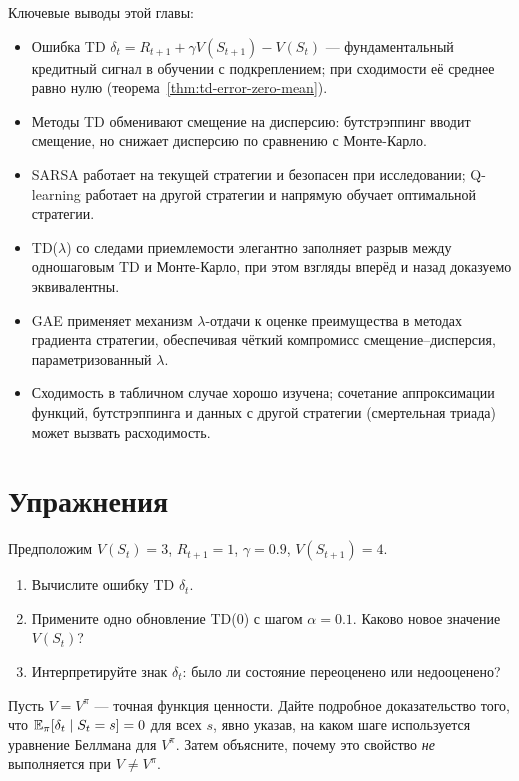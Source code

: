 Ключевые выводы этой главы:
\begin{itemize}[leftmargin=*]
  \item Ошибка TD $\delta_t = R_{t+1}+\gamma V(S_{t+1})-V(S_t)$ --- фундаментальный кредитный сигнал в обучении с подкреплением; при сходимости её среднее равно нулю (теорема~\ref{thm:td-error-zero-mean}).
  \item Методы TD обменивают смещение на дисперсию: бутстрэппинг вводит смещение, но снижает дисперсию по сравнению с Монте-Карло.
  \item SARSA работает на текущей стратегии и безопасен при исследовании; Q-learning работает на другой стратегии и напрямую обучает оптимальной стратегии.
  \item TD($\lambda$) со следами приемлемости элегантно заполняет разрыв между одношаговым TD и Монте-Карло, при этом взгляды вперёд и назад доказуемо эквивалентны.
  \item GAE применяет механизм $\lambda$-отдачи к оценке преимущества в методах градиента стратегии, обеспечивая чёткий компромисс смещение--дисперсия, параметризованный $\lambda$.
  \item Сходимость в табличном случае хорошо изучена; сочетание аппроксимации функций, бутстрэппинга и данных с другой стратегии (смертельная триада) может вызвать расходимость.
\end{itemize}


\section*{Упражнения}

\begin{exercise}
\label{ex:td-error-basic}
Предположим $V(S_t)=3$, $R_{t+1}=1$, $\gamma=0.9$, $V(S_{t+1})=4$.
\begin{enumerate}[label=(\alph*)]
  \item Вычислите ошибку TD $\delta_t$.
  \item Примените одно обновление TD(0) с шагом $\alpha=0.1$.  Каково новое значение $V(S_t)$?
  \item Интерпретируйте знак $\delta_t$: было ли состояние переоценено или недооценено?
\end{enumerate}
\end{exercise}

\begin{exercise}
\label{ex:td-error-zero-mean}
Пусть $V = V^\pi$ --- точная функция ценности.  Дайте подробное доказательство того, что $\operatorname{\mathbb{E}}_\pi[\delta_t \mid S_t=s]=0$ для всех $s$, явно указав, на каком шаге используется уравнение Беллмана для $V^\pi$.  Затем объясните, почему это свойство \emph{не} выполняется при $V \ne V^\pi$.
\end{exercise}

